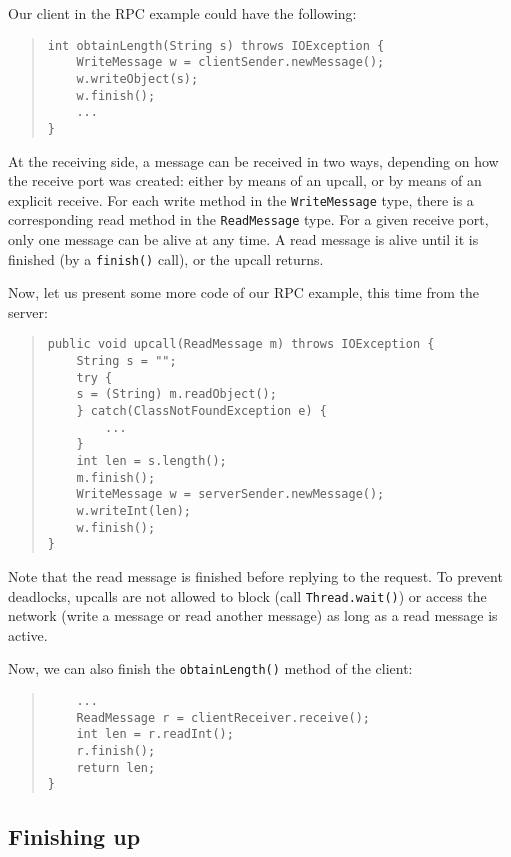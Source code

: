 \documentclass[10pt]{article}
\begin{document}
Our client in the RPC example could have the following:
{\small
\begin{quote}
\begin{verbatim}
int obtainLength(String s) throws IOException {
    WriteMessage w = clientSender.newMessage();
    w.writeObject(s);
    w.finish();
    ...
}
\end{verbatim}
\end{quote}
}

\noindent
At the receiving side, a message can be received in two ways,
depending on how the receive port was created: either by means of an
upcall, or by means of an explicit receive. For each write method
in the \texttt{WriteMessage} type, there is a corresponding read method in
the \texttt{ReadMessage} type. For a given receive port, only one message can
be alive at any time. A read message is alive until it is
finished (by a \texttt{finish()} call), or the upcall returns.

Now, let us present some more code of our RPC example, this time
from the server:

{\small
\begin{quote}
\begin{verbatim}
public void upcall(ReadMessage m) throws IOException {
    String s = "";
    try {
	s = (String) m.readObject();
    } catch(ClassNotFoundException e) {
        ...
    }
    int len = s.length();
    m.finish();
    WriteMessage w = serverSender.newMessage();
    w.writeInt(len);
    w.finish();
}
\end{verbatim}
\end{quote}
}

\noindent
Note that the read message is finished before replying to the
request. To prevent deadlocks, upcalls are not allowed to block
(call \texttt{Thread.wait()}) or access the network (write a message or
read another message) as long as a read message is active.

Now, we can also finish the \texttt{obtainLength()} method of the client:
{\small
\begin{quote}
\begin{verbatim}
    ...
    ReadMessage r = clientReceiver.receive();
    int len = r.readInt();
    r.finish();
    return len;
}
\end{verbatim}
\end{quote}
}

\subsection{Finishing up}
\end{document}

